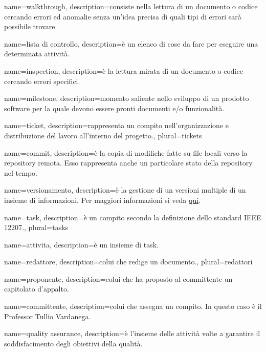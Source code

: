  {
	name=walkthrough,
    description={consiste nella lettura di un documento o codice cercando errori ed anomalie senza un'idea precisa di quali tipi di errori sarà possibile trovare.}
}

 {
	name=lista di controllo,
	description={è un elenco di cose da fare per eseguire una determinata attività.}
}

 {
	name=inspection,
	description={è la lettura mirata di un documento o codice cercando errori specifici.}
}

 {
	name=milestone,
	description={momento saliente nello sviluppo di un prodotto software per la quale devono essere pronti documenti e/o funzionalità.}
}

 {
	name=ticket,
	description={rappresenta un compito nell'organizzazione e distribuzione del lavoro all'interno del progetto.},
	plural=tickets
}

 {
	name=commit,
	description={è la copia di modifiche fatte su file locali verso la repository remota. Esso rappresenta anche un particolare stato della repository nel tempo.}
}

 {
	name=versionamento,
	description={è la gestione di un versioni multiple di un insieme di informazioni. Per maggiori informazioni si veda \href{http://it. wikipedia.org/wiki/Controllo_versione}{qui}.}
}

 {
	name=task,
	description={è un compito secondo la definizione dello standard IEEE 12207.},
	plural=tasks
}

 {
	name=attivita,
	description={è un insieme di task.}
}

 {
	name=redattore,
	description={colui che redige un documento.},
	plural=redattori
}

 {
	name=proponente,
	description={colui che ha proposto al committente un capitolato d'appalto.}
}

 {
	name=committente,
	description={colui che assegna un compito. In questo caso è il Professor Tullio Vardanega.}
}

 {
	name=quality assurance,
	description={è l'insieme delle attività volte a garantire il soddisfacimento degli obiettivi della qualità.}
}

